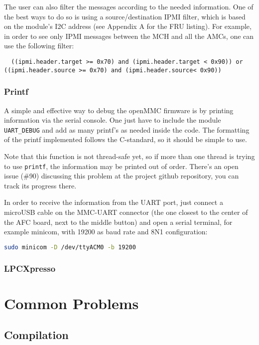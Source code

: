 \documentclass[letterpaper,12pt, titlepage]{article}
\begin{document}
The user can also filter the messages according to the needed information. One of the best ways to do so is using a source/destination IPMI filter, which is based on the module's I2C address (see Appendix A for the FRU listing). For example, in order to see only IPMI messages between the MCH and all the AMCs, one can use the following filter:

\begin{lstlisting}
  ((ipmi.header.target >= 0x70) and (ipmi.header.target < 0x90)) or ((ipmi.header.source >= 0x70) and (ipmi.header.source< 0x90))
\end{lstlisting}


\subsubsection{Printf}
A simple and effective way to debug the openMMC firmware is by printing information via the serial console. One just have to include the module \texttt{UART\_DEBUG} and add as many printf's as needed inside the code. The formatting of the printf implemented follows the C-standard, so it should be simple to use.

Note that this function is not thread-safe yet, so if more than one thread is trying to use \texttt{printf}, the information may be printed out of order. There's an open issue (\#90) discussing this problem at the project github repository, you can track its progress there.

In order to receive the information from the UART port, just connect a microUSB cable on the MMC-UART connector (the one closest to the center of the AFC board, next to the middle button) and open a serial terminal, for example minicom, with 19200 as baud rate and 8N1 configuration:

\begin{lstlisting}[language=bash]
  sudo minicom -D /dev/ttyACM0 -b 19200
\end{lstlisting}

\subsubsection{LPCXpresso}

\section{Common Problems}

\subsection{Compilation}
\end{document}
